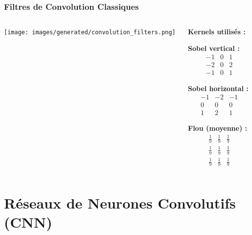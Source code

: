 \documentclass{beamer}
\begin{document}
\begin{frame}
    \frametitle{Filtres de Convolution Classiques}
    \begin{columns}
        \begin{column}{0.6\textwidth}
            \texttt{[image: images/generated/convolution\_filters.png]}
        \end{column}
        \begin{column}{0.4\textwidth}
            \textbf{Kernels utilisés :}
            \vspace{0.3cm}
            
            \textbf{Sobel vertical :}
            \[
            \begin{smallmatrix}
            -1 & 0 & 1 \\
            -2 & 0 & 2 \\
            -1 & 0 & 1
            \end{smallmatrix}
            \]
            
            \textbf{Sobel horizontal :}
            \[
            \begin{smallmatrix}
            -1 & -2 & -1 \\
            0 & 0 & 0 \\
            1 & 2 & 1
            \end{smallmatrix}
            \]
            
            \textbf{Flou (moyenne) :}
            \[
            \begin{smallmatrix}
                \frac{1}{9} & \frac{1}{9} & \frac{1}{9} \\
                \frac{1}{9} & \frac{1}{9} & \frac{1}{9} \\
                \frac{1}{9} & \frac{1}{9} & \frac{1}{9}
            \end{smallmatrix}
            \]
        \end{column}
    \end{columns}
\end{frame}

\section{Réseaux de Neurones Convolutifs (CNN)}
\end{document}
